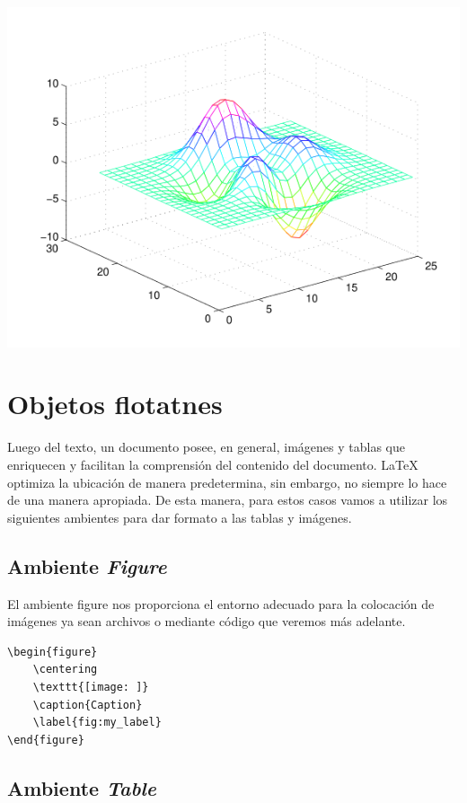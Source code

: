 \documentclass[a4,10pt]{aleph-notas}
\begin{document}
\begin{center}
    \includegraphics[scale = 0.5, trim = {5cm 0 0 0},clip]{Imagenes/figura1.png}
\end{center}

\section{Objetos flotatnes}

Luego del texto, un documento posee, en general, imágenes y tablas que enriquecen y facilitan la comprensión del contenido del documento. \LaTeX{} optimiza la ubicación de manera predetermina, sin embargo, no siempre lo hace de una manera apropiada. De esta manera, para estos casos vamos a utilizar los siguientes ambientes para dar formato a las tablas y imágenes.

\subsection{Ambiente \emph{Figure}}

El ambiente figure nos proporciona el entorno adecuado para la colocación de imágenes ya sean archivos o mediante código que veremos más adelante.

\begin{lstlisting}[frame=single]
\begin{figure}
    \centering
    \texttt{[image: ]}
    \caption{Caption}
    \label{fig:my_label}
\end{figure}
\end{lstlisting}

\subsection{Ambiente \emph{Table}}
\end{document}
